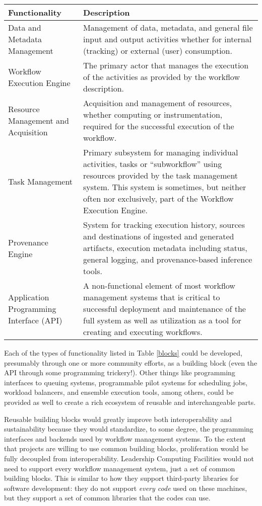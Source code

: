 \begin{table*}[h] \begin{tabularx}{\textwidth}{|X|X|} \hline
\textbf{Functionality} & \textbf{Description} \tabularnewline\hline Data and
Metadata Management & Management of data, metadata, and general file input and
output activities whether for internal (tracking) or external (user)
consumption.  \tabularnewline\hline Workflow Execution Engine & The primary
actor that manages the execution of the activities as provided by the workflow
description. \tabularnewline\hline Resource Management and Acquisition &
Acquisition and management of resources, whether computing or instrumentation,
required for the successful execution of the workflow. \tabularnewline\hline
Task Management & Primary subsystem for managing individual activities, tasks or
``subworkflow'' using resources provided by the task management system. This
system is sometimes, but neither often nor exclusively, part of the Workflow
Execution Engine. \tabularnewline\hline Provenance Engine & System for tracking
execution history, sources and destinations of ingested and generated artifacts,
execution metadata including status, general logging, and provenance-based
inference tools. \tabularnewline\hline Application Programming Interface (API) &
A non-functional element of most workflow management systems that is critical to
successful deployment and maintenance of the full system as well as utilization
as a tool for creating and executing workflows. \tabularnewline\hline
\end{tabularx} \caption{Functionality commonly identified in workflow management
systems.} \label{blocks} \end{table*}

Each of the types of functionality listed in Table
\ref{blocks} could be developed, presumably through one or more community
efforts, as a building block (even the API through some programming
trickery!). Other things like programming interfaces to queuing systems,
programmable pilot systems for scheduling jobs, workload balancers, and
ensemble execution tools, among others, could be provided as well to create a
rich ecosystem of reusable and interchangeable parts.

Reusable building blocks would greatly improve both interoperability and
sustainability because they would standardize, to some degree, the programming
interfaces and backends used by workflow management systems. To the extent that
projects are willing to use common building blocks, proliferation would be fully
decoupled from interoperability. Leadership Computing Facilities would not need
to support every workflow management system, just a set of common building
blocks. This is similar to how they support third-party libraries for software
development: they do not support \textit{every code} used on these machines, but
they support a set of common libraries that the codes can use. 

